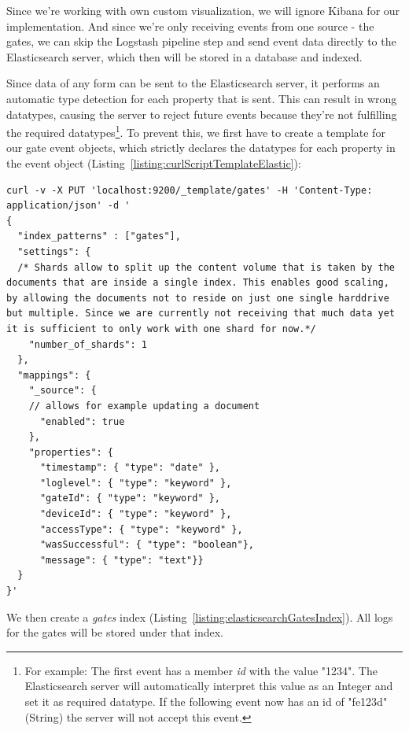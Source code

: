 Since we're working with own custom visualization, we will ignore Kibana for our implementation. And since we're only receiving events from one source - the gates, we can skip the Logstash pipeline step and send event data directly to the Elasticsearch server, which then will be stored in a database and indexed.

Since data of any form can be sent to the Elasticsearch server, it performs an automatic type detection for each property that is sent. This can result in wrong datatypes, causing the server to reject future events because they're not fulfilling the required datatypes\footnote{For example: The first event has a member \emph{id} with the value "1234". The Elasticsearch server will automatically interpret this value as an Integer and set it as required datatype. If the following event now has an id of "fe123d" (String) the server will not accept this event.}. To prevent this, we first have to create a template for our gate event objects, which strictly declares the datatypes for each property in the event object (Listing~\ref{listing:curlScriptTemplateElastic}):

\clearpage

\begin{lstlisting}[label={listing:curlScriptTemplateElastic},caption={cURL script for creating gates index template}]
curl -v -X PUT 'localhost:9200/_template/gates' -H 'Content-Type: application/json' -d '
{
  "index_patterns" : ["gates"],
  "settings": {
  /* Shards allow to split up the content volume that is taken by the documents that are inside a single index. This enables good scaling, by allowing the documents not to reside on just one single harddrive but multiple. Since we are currently not receiving that much data yet it is sufficient to only work with one shard for now.*/
    "number_of_shards": 1
  },
  "mappings": {
    "_source": {
    // allows for example updating a document
      "enabled": true
    },
    "properties": {
      "timestamp": { "type": "date" },
      "loglevel": { "type": "keyword" },
      "gateId": { "type": "keyword" },
      "deviceId": { "type": "keyword" },
      "accessType": { "type": "keyword" },
      "wasSuccessful": { "type": "boolean"},
      "message": { "type": "text"}}
  }
}'
\end{lstlisting}


We then create a \emph{gates} index (Listing~\ref{listing:elasticsearchGatesIndex}). All logs for the gates will be stored under that index.

